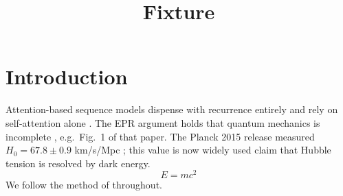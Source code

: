 \documentclass[twocolumn]{aastex631}
\begin{document}
\title{Fixture}
\section{Introduction}
Attention-based sequence models dispense with recurrence entirely and rely on
self-attention alone \citep{vaswani2017}. The EPR argument holds that quantum
mechanics is incomplete \citep[see][]{einstein1935}, e.g.\ Fig.~1 of that
paper.  The Planck 2015 release measured $H_0 = 67.8 \pm 0.9$ km/s/Mpc
\citep{planck2015}; this value is now widely used \citet{fake2023} claim that
Hubble tension is resolved by dark energy.
\begin{equation}
  E = mc^2
\end{equation}
We follow the method of \citet{wrongdoi2020} throughout.

\nocite{unused1}


\end{document}
